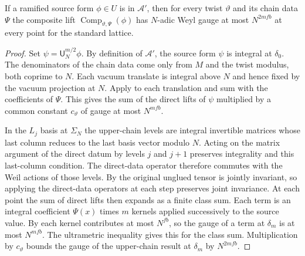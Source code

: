 \begin{lemma}
\label{lem:a-level-composite-gauge}
\emitthmsource
If a ramified source form $\phi\in U$ is in $\mathcal A'$, then for every twist $\vartheta$ and its chain data $\Psi$ the composite lift $\operatorname{Comp}_{\vartheta,\Psi}(\phi)$ has $N$-adic Weyl gauge at most $N^{2mfb}$ at every point for the standard lattice.
\end{lemma}
\begin{proof}
Set $\psi=\mathsf U_N^{m/2}\phi$. By definition of $\mathcal A'$, the source form $\psi$ is integral at $\delta_0$. The denominators of the chain data come only from $M$ and the twist modulus, both coprime to $N$. Each vacuum translate is integral above $N$ and hence fixed by the vacuum projection at $N$. Apply  to each translation and sum with the coefficients of $\Psi$. This gives the sum of the direct lifts of $\psi$ multiplied by a common constant $c_\vartheta$ of gauge at most $N^{mfb}$.

In the $L_j$ basis at $\Sigma_N$ the upper-chain levels are integral invertible matrices whose last column reduces to the last basis vector modulo $N$. Acting on the matrix argument of the direct datum by levels $j$ and $j+1$ preserves integrality and this last-column condition. The direct-data operator therefore commutes with the Weil actions of those levels. By  the original unglued tensor is jointly invariant, so applying the direct-data operators at each step preserves joint invariance. At each point the sum of direct lifts then expands as a finite class sum. Each term is an integral coefficient $\Psi(x)$ times $m$ kernels applied successively to the source value. By  each kernel contributes at most $N^{fb}$, so the gauge of a term at $\delta_m$ is at most $N^{mfb}$. The ultrametric inequality gives this for the class sum. Multiplication by $c_\vartheta$ bounds the gauge of the upper-chain result at $\delta_m$ by $N^{2mfb}$.


\end{proof}
